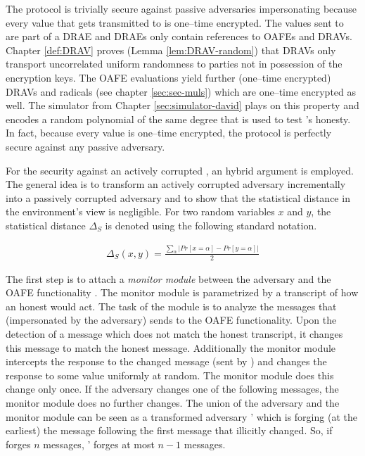 The protocol is trivially secure against passive adversaries impersonating
\JWpTwo{} because every value that gets transmitted to \JWpTwo{} is one--time
encrypted. The values sent to \JWpTwo{} are part of a DRAE and DRAEs only
contain references to OAFEs and DRAVs. Chapter \ref{def:DRAV} proves (Lemma
\ref{lem:DRAV-random}) that DRAVs only transport uncorrelated uniform randomness
to parties not in possession of the encryption keys. The OAFE evaluations yield
further (one--time encrypted) DRAVs and radicals (see chapter
\ref{sec:sec-muls}) which are one--time encrypted as well. The simulator from
Chapter \ref{sec:simulator-david} plays on this property and encodes a random
polynomial of the same degree that is used to test \JWpTwo{}'s honesty. In fact,
because every value is one--time encrypted, the protocol is perfectly secure
against any passive adversary.

For the security against an actively corrupted \JWpTwo{}, an hybrid argument is
employed. The general idea is to transform an actively corrupted adversary
incrementally into a passively corrupted adversary and to show that the
statistical distance in the environment's view is negligible. For two random
variables $x$ and $y$, the statistical distance $\Delta_S$ is denoted using the
following standard notation.

\begin{align*}
  \Delta_S(x,y) = \frac{\sum_\alpha \left|Pr[x=\alpha] - Pr[y=\alpha]\right|}{2}
\end{align*}

\noindent{}The first step is to attach a \emph{monitor module} between the
adversary \JWadv{} and the OAFE functionality \JWfuncSymOAFE{}. The monitor
module is parametrized by a transcript of how an honest \JWpTwo{} would act. The
task of the module is to analyze the messages that \JWpTwo{} (impersonated by
the adversary) sends to the OAFE functionality. Upon the detection of a message
which does not match the honest transcript, it changes this message to match the
honest message. Additionally the monitor module intercepts the response to
the changed message (sent by \JWfuncSymOAFE{}) and changes the response to some
value uniformly at random. The monitor module does this change only once. If the
adversary changes one of the following messages, the monitor module does no
further changes. The union of the adversary \JWadv{} and the
monitor module can be seen as a transformed adversary \JWadv{}' which is forging
(at the earliest) the message following the first message that \JWadv{}
illicitly changed. So, if \JWadv{} forges $n$ messages, \JWadv{}' forges at
most $n-1$ messages.


